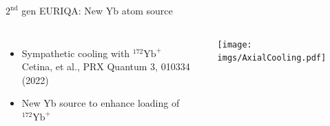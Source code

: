 \documentclass{beamer}
\begin{document}
\begin{frame}{$2^{\text{nd}}$ gen EURIQA: New Yb atom source}
  \begin{center}
    \begin{columns}
      \column{6cm}
      \begin{itemize}
      \item Sympathetic cooling with $^{172}\mathrm{Yb}^+$\\
        {\scriptsize Cetina, et al., PRX Quantum 3, 010334 (2022)}\\
        \vspace{1em}
      \item<2-> New Yb source to enhance loading of $^{172}\mathrm{Yb}^+$
      \end{itemize}
      \vspace{1em}
      \column{5.5cm}
      \texttt{[image: imgs/AxialCooling.pdf]}
      \vspace{2cm}
    \end{columns}
  \end{center}
\end{frame}

\end{document}
